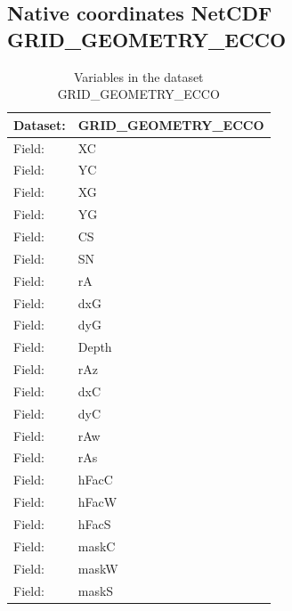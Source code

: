 \pagebreak
\subsection{Native coordinates NetCDF GRID\_GEOMETRY\_ECCO}
\newp
\begin{longtable}{|p{}|p{}|}
\caption{Variables in the dataset GRID\_GEOMETRY\_ECCO}
\label{tab:table-GRID_GEOMETRY_ECCO-fields} \\ 
\hline \endhead \hline \endfoot
\rowcolor{lightgray} \textbf{Dataset:} & \textbf{GRID\_GEOMETRY\_ECCO} \\ \hline
Field: &XC \\ \hline
Field: &YC \\ \hline
Field: &XG \\ \hline
Field: &YG \\ \hline
Field: &CS \\ \hline
Field: &SN \\ \hline
Field: &rA \\ \hline
Field: &dxG \\ \hline
Field: &dyG \\ \hline
Field: &Depth \\ \hline
Field: &rAz \\ \hline
Field: &dxC \\ \hline
Field: &dyC \\ \hline
Field: &rAw \\ \hline
Field: &rAs \\ \hline
Field: &hFacC \\ \hline
Field: &hFacW \\ \hline
Field: &hFacS \\ \hline
Field: &maskC \\ \hline
Field: &maskW \\ \hline
Field: &maskS \\ \hline
\end{longtable}

\pagebreak
